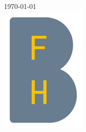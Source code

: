 \begin{titlepage}
		
		{\large \today}\\[2cm] %
		
		
		\includegraphics[scale=0.7]{bfh.png}\\[1cm] %
		
		
		\vfill %
	\end{titlepage}